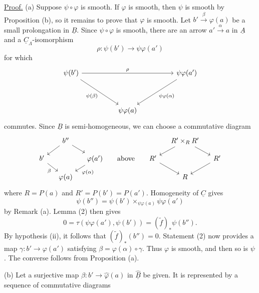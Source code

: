 \underline{Proof.} (a) Suppose $\psi\circ\varphi$ is smooth. If
$\varphi$ is smooth, then $\psi$ is smooth by Proposition (b),
so it remains to prove that $\varphi$ is smooth. Let
$b'\xrightarrow{\beta}\varphi(a)$ be a small prolongation in
$\underline B$. Since $\psi\circ\varphi$ is smooth, there are an
arrow $a'\xrightarrow{\alpha}a$ in $\underline A$ and a
$\underline C_\Lambda$-isomorphism
\[
 \rho:\psi(b')\longrightarrow\psi\varphi(a')
\]
for which
\[
\begin{tikzcd}[column sep=huge,row sep=huge]
 \psi(b') \arrow[rr,"{\rho}"] \arrow[dr,"{\psi(\beta)}"']
 && \psi\varphi(a') \arrow[dl,"{\psi\varphi(\alpha)}"]\\
 & \psi\varphi(a) &
\end{tikzcd}
\]
commutes. Since $\underline B$ is semi-homogeneous, we can choose a
commutative diagram
\[
\begin{tikzcd}[column sep=small,row sep=small]
 & b'' \arrow[dl] \arrow[dr] &
 &&& R'\times_RR' \arrow[dl] \arrow[dr] &\\
 b' \arrow[dr,"{\beta}"'] &&
 \varphi(a') \arrow[dl,"{\varphi(\alpha)}"]
 & \text{above} &
 R' \arrow[dr] && R' \arrow[dl]\\
 & \varphi(a) &&&& R &
\end{tikzcd}
\]
where $R=P(a)$ and $R'=P(b')=P(a')$. Homogeneity of
$\underline C$ gives
\[
 \psi(b'')=
 \psi(b')\times_{\psi\varphi(a)}\psi\varphi(a')
\]
by Remark (a). Lemma (2) then gives
\[
 0=\tau(\psi\varphi(a'),\psi(b'))
   =(\widetilde f)_*\psi(b'').
\]
By hypothesis (ii), it follows that $(\widetilde f)_*(b'')=0$.
Statement (2) now provides a map
$\gamma:b'\longrightarrow\varphi(a')$ satisfying
$\beta=\varphi(\alpha)\circ\gamma$. Thus $\varphi$ is smooth, and
then so is $\psi$. The converse follows from Proposition (a).

(b) Let a surjective map
$\beta:b'\longrightarrow\widehat\varphi(a)$ in
$\widehat{\underline B}$ be given. It is represented by a sequence
of commutative diagrams


